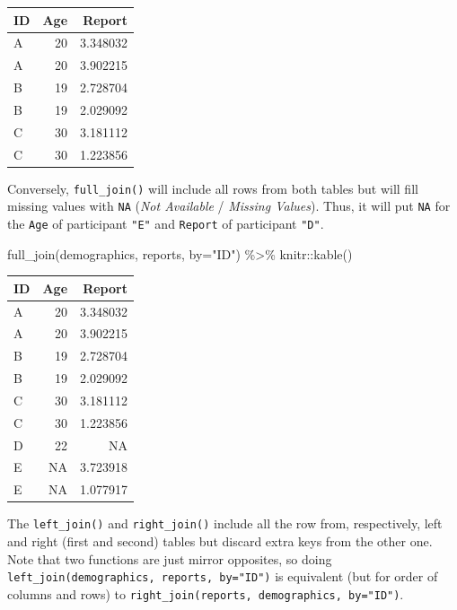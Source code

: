 \documentclass[
]{book}
\newenvironment{Shaded}{\begin{snugshade}}{\end{snugshade}}
\newcommand{\AttributeTok}[1]{\textcolor[rgb]{0.77,0.63,0.00}{#1}}
\newcommand{\FunctionTok}[1]{\textcolor[rgb]{0.00,0.00,0.00}{#1}}
\newcommand{\NormalTok}[1]{#1}
\newcommand{\SpecialCharTok}[1]{\textcolor[rgb]{0.00,0.00,0.00}{#1}}
\newcommand{\StringTok}[1]{\textcolor[rgb]{0.31,0.60,0.02}{#1}}
\begin{document}
\begin{tabular}{l|r|r}
\hline
ID & Age & Report\\
\hline
A & 20 & 3.348032\\
\hline
A & 20 & 3.902215\\
\hline
B & 19 & 2.728704\\
\hline
B & 19 & 2.029092\\
\hline
C & 30 & 3.181112\\
\hline
C & 30 & 1.223856\\
\hline
\end{tabular}

Conversely, \texttt{full\_join()} will include all rows from both tables but will fill missing values with \texttt{NA} (\emph{Not Available} / \emph{Missing Values}). Thus, it will put \texttt{NA} for the \texttt{Age} of participant \texttt{"E"} and \texttt{Report} of participant \texttt{"D"}.

\begin{Shaded}
\begin{Highlighting}[]
\FunctionTok{full\_join}\NormalTok{(demographics, reports, }\AttributeTok{by=}\StringTok{"ID"}\NormalTok{) }\SpecialCharTok{\%\textgreater{}\%}
\NormalTok{  knitr}\SpecialCharTok{::}\FunctionTok{kable}\NormalTok{()}
\end{Highlighting}
\end{Shaded}

\begin{tabular}{l|r|r}
\hline
ID & Age & Report\\
\hline
A & 20 & 3.348032\\
\hline
A & 20 & 3.902215\\
\hline
B & 19 & 2.728704\\
\hline
B & 19 & 2.029092\\
\hline
C & 30 & 3.181112\\
\hline
C & 30 & 1.223856\\
\hline
D & 22 & NA\\
\hline
E & NA & 3.723918\\
\hline
E & NA & 1.077917\\
\hline
\end{tabular}

The \texttt{left\_join()} and \texttt{right\_join()} include all the row from, respectively, left and right (first and second) tables but discard extra keys from the other one. Note that two functions are just mirror opposites, so doing \texttt{left\_join(demographics,\ reports,\ by="ID")} is equivalent (but for order of columns and rows) to \texttt{right\_join(reports,\ demographics,\ by="ID")}.
\end{document}

